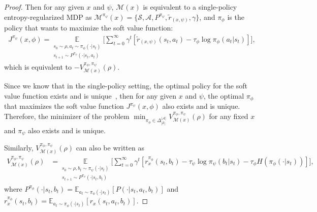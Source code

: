 \documentclass{article}
\theoremstyle{plain}
\theoremstyle{definition}
\theoremstyle{remark}
\def\cA{\mathcal A}
\def\cM{\mathcal M}
\def\cS{\mathcal S}
\begin{document}
\begin{proof}
    Then for any given $x$ and $\psi$, $\cM(x)$ is equivalent to a single-policy entropy-regularized MDP as $\mathcal{M}^{\pi_\psi}(x) = \{\mathcal{S},\mathcal{A}, P^{\pi_\psi}, \tilde{r}_{(x,\psi)}, \gamma\}$, and $\pi_\phi$ is the policy that wants to maximize the soft value function:
    \begin{align}
        J^{\pi_\psi}(x,\phi) = \underset{\substack{s_0 \sim \rho, a_t \sim \pi_\phi(\cdot|s_t) \\s_{t+1} \sim P^{\pi_\psi}(\cdot|s_t,a_t)}}{\mathbb{E}} \bigg[
            \sum_{t=0}^{\infty} \gamma^t \left[
                \tilde{r}_{(x,\psi)}(s_t,a_t) - \tau_\phi \log \pi_\phi(a_t|s_t)
            \right]   
        \bigg] ,
    \end{align}
    which is equivalent to $- V^{\pi_\phi,\pi_\psi}_{\cM(x)}(\rho)$.

    Since we know that in the single-policy setting, the optimal policy for the soft value function exists and is unique~\citep{geist2019theory}, then for any given $x$ and $\psi$, the optimal $\pi_\phi$ that maximizes the soft value function $J^{\pi_\psi}(x,\phi)$ also exists and is unique. Therefore, the minimizer of the problem
$\min_{\pi_\phi \in \Delta_{|\cS|}^{|\cA|}}
V_{\cM(x)}^{\pi_\phi,\pi_\psi}(\rho)$
for any fixed $x$ and $\pi_\psi$ also exists and is unique.

    Similarly, $V^{\pi_\phi,\pi_\psi}_{\cM(x)}(\rho)$ can also be written as
    \begin{align}
        V^{\pi_\phi,\pi_\psi}_{\cM(x)}(\rho) & =\underset{\substack{s_0 \sim \rho, b_t \sim \pi_\psi(\cdot|s_t) \\s_{t+1} \sim P^{\pi_\phi}(\cdot|s_t,b_t)}}{\mathbb{E}} \bigg[
            \sum_{t=0}^{\infty} \gamma^t \left[
                r^{\pi_\phi}_x(s_t,b_t) - \tau_\psi \log \pi_\psi(b_t|s_t) - \tau_\phi H(\pi_\phi(\cdot|s_t))
            \right]
        \bigg],
    \end{align}
    where $P^{\pi_\phi}(\cdot|s_t,b_t) = \mathbb{E}_{a_t \sim \pi_\phi(\cdot|s_t)}[P(\cdot|s_t,a_t,b_t)]$ and $r^{\pi_\phi}_x(s_t,b_t) = \mathbb{E}_{a_t \sim \pi_\phi(\cdot|s_t)}[r_x(s_t,a_t,b_t)]$.


\end{proof}
\end{document}
